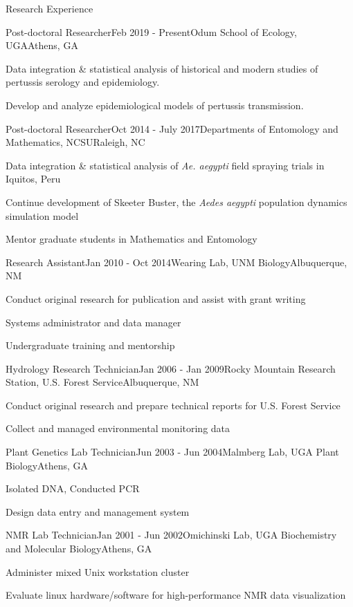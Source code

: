 \documentclass{resume} %
\begin{document}
\begin{rSection}{Research Experience}

\begin{rSubsection}{Post-doctoral Researcher}{Feb 2019 - Present}{Odum School of
Ecology, UGA}{Athens, GA}
\item Data integration \& statistical analysis of historical and modern studies of pertussis serology and epidemiology.
\item Develop and analyze epidemiological models of pertussis transmission.
\end{rSubsection}

\begin{rSubsection}{Post-doctoral Researcher}{Oct 2014 - July 2017}{Departments of
Entomology and Mathematics, NCSU}{Raleigh, NC}
\item Data integration \& statistical analysis of {\em Ae. aegypti} field spraying trials in Iquitos, Peru
\item Continue development of Skeeter Buster, the {\em Aedes aegypti} population dynamics simulation model
\item Mentor graduate students in Mathematics and Entomology
\end{rSubsection}

\begin{rSubsection}{Research Assistant}{Jan 2010 - Oct 2014}{Wearing Lab, UNM Biology}{Albuquerque, NM}
\item Conduct original research for publication and assist with grant writing
\item Systems administrator and data manager
\item Undergraduate training and mentorship
\end{rSubsection}

\begin{rSubsection}{Hydrology Research Technician}{Jan 2006 - Jan 2009}{Rocky
Mountain Research Station, U.S. Forest Service}{Albuquerque, NM}
\item Conduct original research and prepare technical reports for U.S. Forest Service
\item Collect and managed environmental monitoring data 
\end{rSubsection}

\begin{rSubsection}{Plant Genetics Lab Technician}{Jun 2003 - Jun 2004}{Malmberg Lab, UGA Plant Biology}{Athens, GA}
\item Isolated DNA, Conducted PCR
\item Design data entry and management system
\end{rSubsection}

\begin{rSubsection}{NMR Lab Technician}{Jan 2001 - Jun 2002}{Omichinski Lab, UGA
Biochemistry and Molecular Biology}{Athens, GA}
\item Administer mixed Unix workstation cluster
\item Evaluate linux hardware/software for high-performance NMR data visualization
\end{rSubsection}
\end{rSection}
\end{document}

